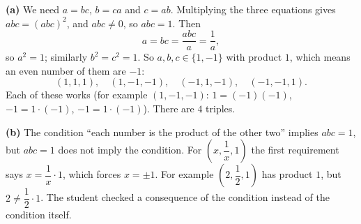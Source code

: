 \textbf{(a)} We need $a=bc$, $b=ca$ and $c=ab$. Multiplying the three equations gives $abc=(abc)^2$, and $abc\ne0$, so $abc=1$. Then
\[a=bc=\dfrac{abc}{a}=\dfrac{1}{a},\]
so $a^2=1$; similarly $b^2=c^2=1$. So $a,b,c\in\{1,-1\}$ with product $1$, which means an even number of them are $-1$:
\[(1,1,1),\quad(1,-1,-1),\quad(-1,1,-1),\quad(-1,-1,1).\]
Each of these works (for example $(1,-1,-1)$: $1=(-1)(-1)$, $-1=1\cdot(-1)$, $-1=1\cdot(-1)$). There are $\boxed{4}$ triples.

\textbf{(b)} The condition ``each number is the product of the other two'' implies $abc=1$, but $abc=1$ does not imply the condition. For $\left(x,\dfrac{1}{x},1\right)$ the first requirement says $x=\dfrac{1}{x}\cdot1$, which forces $x=\pm1$. For example $\left(2,\dfrac{1}{2},1\right)$ has product $1$, but $2\ne\dfrac{1}{2}\cdot1$. The student checked a consequence of the condition instead of the condition itself.
